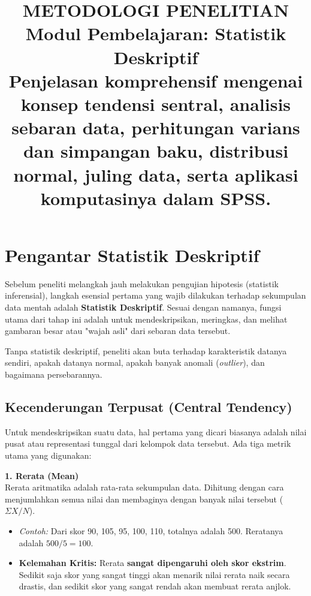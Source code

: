 \documentclass[12pt,a4paper]{article}
\title{
  {\LARGE\bfseries METODOLOGI PENELITIAN}\\[0.5em]
  {\large Modul Pembelajaran: Statistik Deskriptif}\\[0.8em]
  {\normalsize Penjelasan komprehensif mengenai konsep tendensi sentral, analisis sebaran data, perhitungan varians dan simpangan baku, distribusi normal, juling data, serta aplikasi komputasinya dalam SPSS.}
}
\author{}
\date{}
\begin{document}
\maketitle
\thispagestyle{fancy}
\tableofcontents
\newpage


\section{Pengantar Statistik Deskriptif}

Sebelum peneliti melangkah jauh melakukan pengujian hipotesis (statistik inferensial), langkah esensial pertama yang wajib dilakukan terhadap sekumpulan data mentah adalah \textbf{Statistik Deskriptif}. Sesuai dengan namanya, fungsi utama dari tahap ini adalah untuk mendeskripsikan, meringkas, dan melihat gambaran besar atau "wajah asli" dari sebaran data tersebut.

Tanpa statistik deskriptif, peneliti akan buta terhadap karakteristik datanya sendiri, apakah datanya normal, apakah banyak anomali (\textit{outlier}), dan bagaimana persebarannya.

\subsection{Kecenderungan Terpusat (Central Tendency)}
Untuk mendeskripsikan suatu data, hal pertama yang dicari biasanya adalah nilai pusat atau representasi tunggal dari kelompok data tersebut. Ada tiga metrik utama yang digunakan:

\textbf{1. Rerata (Mean)} \\
Rerata aritmatika adalah rata-rata sekumpulan data. Dihitung dengan cara menjumlahkan semua nilai dan membaginya dengan banyak nilai tersebut ($\Sigma X / N$).
\begin{itemize}
    \item \textit{Contoh:} Dari skor 90, 105, 95, 100, 110, totalnya adalah 500. Reratanya adalah $500 / 5 = 100$.
    \item \textbf{Kelemahan Kritis:} Rerata \textbf{sangat dipengaruhi oleh skor ekstrim}. Sedikit saja skor yang sangat tinggi akan menarik nilai rerata naik secara drastis, dan sedikit skor yang sangat rendah akan membuat rerata anjlok.
\end{itemize}
\end{document}
